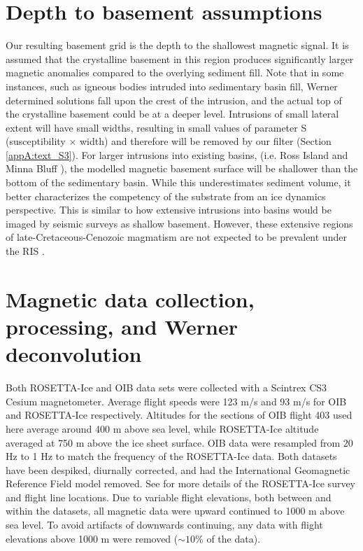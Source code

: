 \section{Depth to basement assumptions} \label{appA:text_S1}
Our resulting basement grid is the depth to the shallowest magnetic signal. It is assumed that the crystalline basement in this region produces significantly larger magnetic anomalies compared to the overlying sediment fill. Note that in some instances, such as igneous bodies intruded into sedimentary basin fill, Werner determined solutions fall upon the crest of the intrusion, and the actual top of the crystalline basement could be at a deeper level. Intrusions of small lateral extent will have small widths, resulting in small values of parameter S (susceptibility $\times$ width) and therefore will be removed by our filter (Section \ref{appA:text_S3}). For larger intrusions into existing basins, (i.e. Ross Island and Minna Bluff \cite{coxcontinentwide2023}), the modelled magnetic basement surface will be shallower than the bottom of the sedimentary basin. While this underestimates sediment volume, it better characterizes the competency of the substrate from an ice dynamics perspective. This is similar to how extensive intrusions into basins would be imaged by seismic surveys as shallow basement. However, these extensive regions of late-Cretaceous-Cenozoic magmatism are not expected to be prevalent under the RIS \citep{andrewsresolving2021}.

\section{Magnetic data collection, processing, and Werner deconvolution} \label{appA:text_S2}
Both ROSETTA-Ice and OIB data sets were collected with a Scintrex CS3 Cesium magnetometer. Average flight speeds were 123 m/s and 93 m/s for OIB and ROSETTA-Ice respectively. Altitudes for the sections of OIB flight 403 used here average around 400 m above sea level, while ROSETTA-Ice altitude averaged at 750 m above the ice sheet surface. OIB data were resampled from 20 Hz to 1 Hz to match the frequency of the ROSETTA-Ice data. Both datasets have been despiked, diurnally corrected, and had the International Geomagnetic Reference Field model removed. See \citet{tintoross2019} for more details of the ROSETTA-Ice survey and flight line locations. Due to variable flight elevations, both between and within the datasets, all magnetic data were upward continued to 1000 m above sea level. To avoid artifacts of downwards continuing, any data with flight elevations above 1000 m were removed ($\sim10$\% of the data).\\

